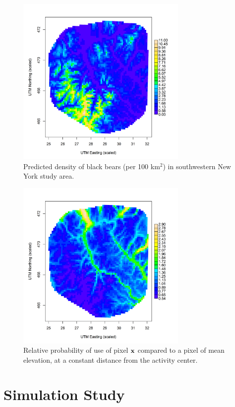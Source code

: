 \begin{figure}
\centering
\includegraphics[width=3.25in,height=3.25in]{Ch13-RSF/figs/density2.png}
\caption{Predicted density of black bears (per 100 km$^2$) in
  southwestern  New York study
  area.
}
\label{fig.density}
\end{figure}


\begin{figure}
\centering
\includegraphics[width=3.25in,height=3.25in]{Ch13-RSF/figs/spaceusage2.png}
\caption{Relative probability of use of pixel ${\bf x}$ compared to a pixel
  of mean elevation, at a constant distance from the activity center.
}
\label{fig.spaceusage}
\end{figure}



\section{Simulation Study}

